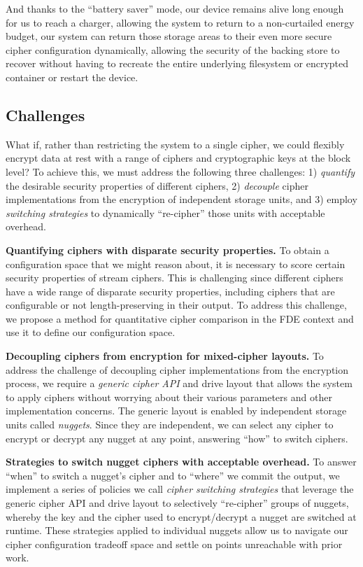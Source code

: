 And thanks to the ``battery saver'' mode, our device remains alive long enough
for us to reach a charger, allowing the system to return to a non-curtailed
energy budget, our system can return those storage areas to their even more
secure cipher configuration dynamically, allowing the security of the backing
store to recover without having to recreate the entire underlying filesystem or
encrypted container or restart the device.

\subsection{Challenges}

What if, rather than restricting the system to a single cipher, we could
flexibly encrypt data at rest with a range of ciphers and cryptographic keys at
the block level? To achieve this, we must address the following three
challenges: 1) \emph{quantify} the desirable security properties of different
ciphers, 2) \emph{decouple} cipher implementations from the encryption of
independent storage units, and 3) employ \emph{switching strategies} to
dynamically ``re-cipher'' those units with acceptable overhead.

\textbf{Quantifying ciphers with disparate security properties.} To obtain a
configuration space that we might reason about, it is necessary to score certain
security properties of stream ciphers. This is challenging since different
ciphers have a wide range of disparate security properties, including ciphers
that are configurable or not length-preserving in their output. To address this
challenge, we propose a method for quantitative cipher comparison in the FDE
context and use it to define our configuration space.

\textbf{Decoupling ciphers from encryption for mixed-cipher layouts.}
To address the challenge of decoupling cipher implementations from the
encryption process, we require a \emph{generic cipher API} and drive layout that
allows the system to apply ciphers without worrying about their various
parameters and other implementation concerns. The generic layout is enabled by
independent storage units called \emph{nuggets}. Since they are independent, we
can select any cipher to encrypt or decrypt any nugget at any point, answering
``how'' to switch ciphers.

\textbf{Strategies to switch nugget ciphers with acceptable overhead.} To answer
``when'' to switch a nugget's cipher and to ``where'' we commit the output, we
implement a series of policies we call \textit{cipher switching strategies} that
leverage the generic cipher API and drive layout to selectively ``re-cipher''
groups of nuggets, whereby the key and the cipher used to encrypt/decrypt a
nugget are switched at runtime. These strategies applied to individual nuggets
allow us to navigate our cipher configuration tradeoff space and settle on
points unreachable with prior work.
